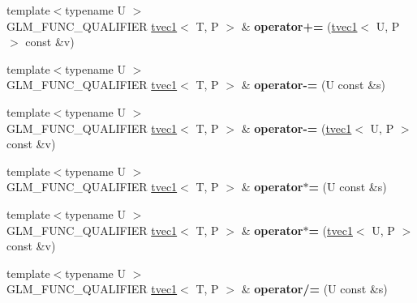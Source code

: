 \begin{DoxyCompactItemize}
\item 
\hypertarget{structglm_1_1tvec1_ac579b8e14a7aa466cb0185e0e5fb7b3d}{{\footnotesize template$<$typename U $>$ }\\G\-L\-M\-\_\-\-F\-U\-N\-C\-\_\-\-Q\-U\-A\-L\-I\-F\-I\-E\-R \hyperlink{structglm_1_1tvec1}{tvec1}$<$ T, P $>$ \& {\bfseries operator+=} (\hyperlink{structglm_1_1tvec1}{tvec1}$<$ U, P $>$ const \&v)}\label{structglm_1_1tvec1_ac579b8e14a7aa466cb0185e0e5fb7b3d}

\item 
\hypertarget{structglm_1_1tvec1_a2304aaac60c3725692681149c99301ee}{{\footnotesize template$<$typename U $>$ }\\G\-L\-M\-\_\-\-F\-U\-N\-C\-\_\-\-Q\-U\-A\-L\-I\-F\-I\-E\-R \hyperlink{structglm_1_1tvec1}{tvec1}$<$ T, P $>$ \& {\bfseries operator-\/=} (U const \&s)}\label{structglm_1_1tvec1_a2304aaac60c3725692681149c99301ee}

\item 
\hypertarget{structglm_1_1tvec1_adda6b97039322228b22bae46dc2412f2}{{\footnotesize template$<$typename U $>$ }\\G\-L\-M\-\_\-\-F\-U\-N\-C\-\_\-\-Q\-U\-A\-L\-I\-F\-I\-E\-R \hyperlink{structglm_1_1tvec1}{tvec1}$<$ T, P $>$ \& {\bfseries operator-\/=} (\hyperlink{structglm_1_1tvec1}{tvec1}$<$ U, P $>$ const \&v)}\label{structglm_1_1tvec1_adda6b97039322228b22bae46dc2412f2}

\item 
\hypertarget{structglm_1_1tvec1_add52e6d0eae8abe384806c162d3b5038}{{\footnotesize template$<$typename U $>$ }\\G\-L\-M\-\_\-\-F\-U\-N\-C\-\_\-\-Q\-U\-A\-L\-I\-F\-I\-E\-R \hyperlink{structglm_1_1tvec1}{tvec1}$<$ T, P $>$ \& {\bfseries operator$\ast$=} (U const \&s)}\label{structglm_1_1tvec1_add52e6d0eae8abe384806c162d3b5038}

\item 
\hypertarget{structglm_1_1tvec1_ad4cb2d433838e6595769a4239aa5a47c}{{\footnotesize template$<$typename U $>$ }\\G\-L\-M\-\_\-\-F\-U\-N\-C\-\_\-\-Q\-U\-A\-L\-I\-F\-I\-E\-R \hyperlink{structglm_1_1tvec1}{tvec1}$<$ T, P $>$ \& {\bfseries operator$\ast$=} (\hyperlink{structglm_1_1tvec1}{tvec1}$<$ U, P $>$ const \&v)}\label{structglm_1_1tvec1_ad4cb2d433838e6595769a4239aa5a47c}

\item 
\hypertarget{structglm_1_1tvec1_a1a18a633991e327109958a45ebba8eac}{{\footnotesize template$<$typename U $>$ }\\G\-L\-M\-\_\-\-F\-U\-N\-C\-\_\-\-Q\-U\-A\-L\-I\-F\-I\-E\-R \hyperlink{structglm_1_1tvec1}{tvec1}$<$ T, P $>$ \& {\bfseries operator/=} (U const \&s)}\label{structglm_1_1tvec1_a1a18a633991e327109958a45ebba8eac}


\end{DoxyCompactItemize}
